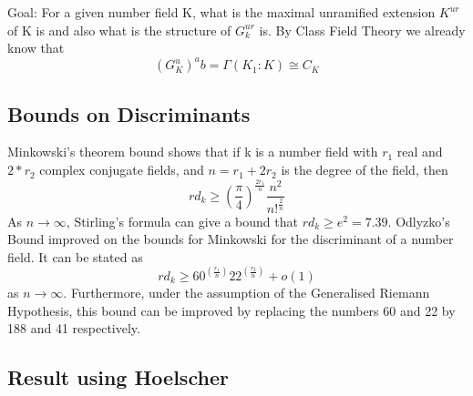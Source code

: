 \documentclass[preprint,12pt]{elsarticle}
\begin{document}
Goal: For a given number field K, what is the maximal unramified extension $K^{ur}$ of K is and also what is the structure of $G_k^{ur}$ is. By Class Field Theory we already know that 
\[(G_K^u)^ab = \Gamma(K_1:K)\cong C_K\]
\medskipskip

\subsection{Bounds on Discriminants}
Minkowski's theorem bound shows that if k is a number field with $r_1$ real and $2*r_2$ complex conjugate fields, and $n=r_1+2r_2$ is the degree of the field, then 
\newline 
\[rd_k\geqslant (\frac{\pi}{4})^{\frac{2r_1}{n}}\frac{n^2}{n!^{\frac{2}{n}}}\]
\newline
As $n\rightarrow \infty$, Stirling's formula can give a bound that $rd_k\geqslant e^2 = 7.39$.
\newline
Odlyzko's Bound \cite{ODL2} improved on the bounds for Minkowski for the discriminant of a number field. It can be stated as  
\medskip
\newline
\[rd_k\geqslant 60^{(\frac{r_1}{n})}22^{(\frac{r_2}{n})}+o(1)\] as $n\rightarrow \infty$.
\newline
Furthermore, under the assumption of the Generalised Riemann Hypothesis, 
this bound can be improved by replacing the numbers 60 and 22 by 188 and 41 respectively. 


\subsection{Result using Hoelscher}
\end{document}
